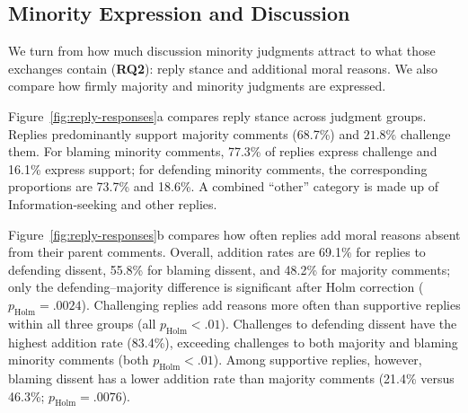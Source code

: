 \subsection{Minority Expression and Discussion}
\label{subsec:res-perspectives}

We turn from how much discussion minority judgments attract to what
those exchanges contain (\textbf{RQ2}): reply stance and additional moral
reasons. We also compare how firmly majority and minority judgments are
expressed.




\label{subsec:res-reply-orientation}
Figure~\ref{fig:reply-responses}a compares reply stance across judgment
groups. Replies predominantly support majority comments (68.7\%) and $21.8\%$ challenge them.
For blaming minority comments, 77.3\% of replies express challenge and
16.1\% express support; for defending minority comments, the corresponding
proportions are 73.7\% and 18.6\%. A combined ``other'' category is made up of Information-seeking and other replies.

Figure~\ref{fig:reply-responses}b compares how often replies add moral
reasons absent from their parent comments. Overall, addition rates are
69.1\% for replies to defending dissent, 55.8\% for blaming dissent, and
48.2\% for majority comments; only the defending--majority difference is
significant after Holm correction ($p_{\mathrm{Holm}}=.0024$).
Challenging replies add reasons more often than supportive replies
within all three groups (all $p_{\mathrm{Holm}}<.01$).
Challenges to defending dissent have the highest addition rate (83.4\%),
exceeding challenges to both majority and blaming minority comments
(both $p_{\mathrm{Holm}}<.01$). Among supportive replies, however,
blaming dissent has a lower addition rate than majority comments
(21.4\% versus 46.3\%; $p_{\mathrm{Holm}}=.0076$).

